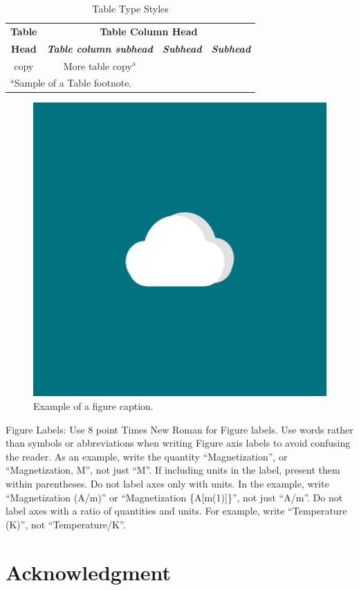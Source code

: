 \documentclass[10pt,conference]{IEEEtran}
\begin{document}
\begin{table}[htbp]
\caption{Table Type Styles}
\begin{center}
\begin{tabular}{|c|c|c|c|}
\hline
\textbf{Table}&\multicolumn{3}{|c|}{\textbf{Table Column Head}} \\
\cline{2-4} 
\textbf{Head} & \textbf{\textit{Table column subhead}}& \textbf{\textit{Subhead}}& \textbf{\textit{Subhead}} \\
\hline
copy& More table copy$^{\mathrm{a}}$& &  \\
\hline
\multicolumn{4}{l}{$^{\mathrm{a}}$Sample of a Table footnote.}
\end{tabular}
\label{tab1}
\end{center}
\end{table}

\begin{figure}[htbp]
\centerline{\includegraphics[width=0.5\columnwidth]{LogoBayuGede.png}}
\caption{Example of a figure caption.}
\label{fig}
\end{figure}

Figure Labels: Use 8 point Times New Roman for Figure labels. Use words 
rather than symbols or abbreviations when writing Figure axis labels to 
avoid confusing the reader. As an example, write the quantity 
``Magnetization'', or ``Magnetization, M'', not just ``M''. If including 
units in the label, present them within parentheses. Do not label axes only 
with units. In the example, write ``Magnetization (A/m)'' or ``Magnetization 
\{A[m(1)]\}'', not just ``A/m''. Do not label axes with a ratio of 
quantities and units. For example, write ``Temperature (K)'', not 
``Temperature/K''.

\section*{Acknowledgment}
\end{document}
